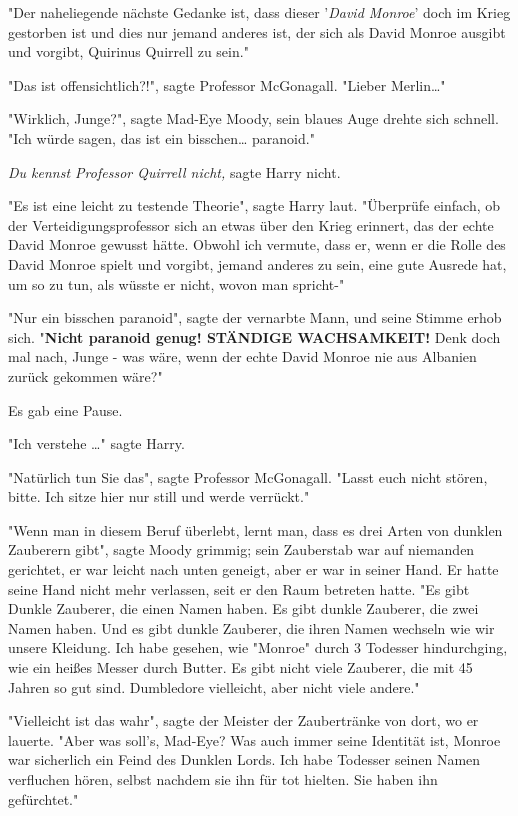 {"Der naheliegende nächste Gedanke ist, dass dieser '\emph{David Monroe}' doch im Krieg gestorben ist und dies nur jemand anderes ist, der sich als David Monroe ausgibt und vorgibt, Quirinus Quirrell zu sein."

"Das ist offensichtlich?!", sagte Professor McGonagall. "Lieber Merlin…"

"Wirklich, Junge?", sagte Mad-Eye Moody, sein blaues Auge drehte sich schnell. "Ich würde sagen, das ist ein bisschen… paranoid."

\emph{Du kennst Professor Quirrell nicht,} sagte Harry nicht.

"Es ist eine leicht zu testende Theorie", sagte Harry laut. "Überprüfe einfach, ob der Verteidigungsprofessor sich an etwas über den Krieg erinnert, das der echte David Monroe gewusst hätte. Obwohl ich vermute, dass er, wenn er die Rolle des David Monroe spielt und vorgibt, jemand anderes zu sein, eine gute Ausrede hat, um so zu tun, als wüsste er nicht, wovon man spricht-"

"Nur ein bisschen paranoid", sagte der vernarbte Mann, und seine Stimme erhob sich. "\textbf{Nicht paranoid genug! STÄNDIGE WACHSAMKEIT!} Denk doch mal nach, Junge - was wäre, wenn der echte David Monroe nie aus Albanien zurück gekommen wäre?"

Es gab eine Pause.

"Ich verstehe …" sagte Harry.

"Natürlich tun Sie das", sagte Professor McGonagall. "Lasst euch nicht stören, bitte. Ich sitze hier nur still und werde verrückt."

"Wenn man in diesem Beruf überlebt, lernt man, dass es drei Arten von dunklen Zauberern gibt", sagte Moody grimmig; sein Zauberstab war auf niemanden gerichtet, er war leicht nach unten geneigt, aber er war in seiner Hand. Er hatte seine Hand nicht mehr verlassen, seit er den Raum betreten hatte. "Es gibt Dunkle Zauberer, die einen Namen haben. Es gibt dunkle Zauberer, die zwei Namen haben. Und es gibt dunkle Zauberer, die ihren Namen wechseln wie wir unsere Kleidung. Ich habe gesehen, wie "Monroe" durch 3 Todesser hindurchging, wie ein heißes Messer durch Butter. Es gibt nicht viele Zauberer, die mit 45 Jahren so gut sind. Dumbledore vielleicht, aber nicht viele andere."

"Vielleicht ist das wahr", sagte der Meister der Zaubertränke von dort, wo er lauerte. "Aber was soll's, Mad-Eye? Was auch immer seine Identität ist, Monroe war sicherlich ein Feind des Dunklen Lords. Ich habe Todesser seinen Namen verfluchen hören, selbst nachdem sie ihn für tot hielten. Sie haben ihn gefürchtet."

}
